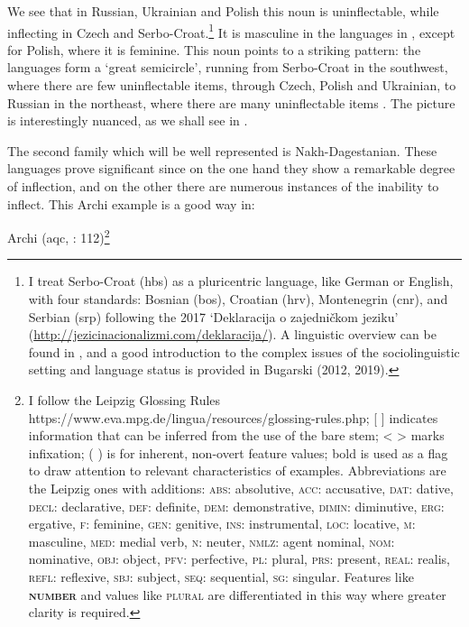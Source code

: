 \documentclass[output=paper]{langscibook}
\begin{document}
We see that in Russian, Ukrainian and Polish this noun is uninflectable, while inflecting in Czech and Serbo-Croat.\footnote{ \textrm{I treat Serbo-Croat (hbs) as a pluricentric language, like German or English, with four standards: Bosnian (bos), Croatian (hrv), Montenegrin (cnr), and Serbian (srp) following the 2017 ‘Deklaracija o zajedničkom jeziku’ (}\url{http://jezicinacionalizmi.com/deklaracija/}\textrm{). A linguistic overview can be found in \citet{CorbettBrowne2018}, and a good introduction to the complex issues of the sociolinguistic setting and language status is provided in Bugarski (2012, 2019).}} It is masculine in the languages in , except for Polish, where it is feminine. This noun points to a striking pattern: the languages form a ‘great semicircle’, running from Serbo-Croat in the southwest, where there are few uninflectable items, through Czech, Polish and Ukrainian, to Russian in the northeast, where there are many uninflectable items \citep[11-12]{Worth1966}. The picture is interestingly nuanced, as we shall see in .

The second family which will be well represented is Nakh-Dagestanian. These languages prove significant since on the one hand they show a remarkable degree of inflection, and on the other there are numerous instances of the inability to inflect. This Archi example is a good way in: 

Archi (aqc, \citealt{ChumakinaBond2016}: 112)\footnote{ \textrm{I follow the Leipzig Glossing Rules https://www.eva.mpg.de/lingua/resources/glossing-rules.php; [ ] indicates information that can be inferred from the use of the bare stem; < > marks infixation; ( ) is for inherent, non-overt feature values; bold is used as a flag to draw attention to relevant characteristics of examples. Abbreviations are the Leipzig ones with additions:} \textrm{\textsc{abs}}\textrm{: absolutive,} \textrm{\textsc{acc}}\textrm{: accusative,} \textrm{\textsc{dat}}\textrm{: dative,} \textrm{\textsc{decl}}\textrm{: declarative,} \textrm{\textsc{def}}\textrm{: definite,} \textrm{\textsc{dem}}\textrm{: demonstrative,} \textrm{\textsc{dimin}}\textrm{: diminutive,} \textrm{\textsc{erg}}\textrm{: ergative,} \textrm{\textsc{f}}\textrm{: feminine,} \textrm{\textsc{gen}}\textrm{: genitive,} \textrm{\textsc{ins}}\textrm{: instrumental,} \textrm{\textsc{loc}}\textrm{: locative,} \textrm{\textsc{m}}\textrm{: masculine,} \textrm{\textsc{med}}\textrm{: medial verb,} \textrm{\textsc{n}}\textrm{: neuter,} \textrm{\textsc{nmlz}}\textrm{: agent nominal,} \textrm{\textsc{nom}}\textrm{: nominative,} \textrm{\textsc{obj}}\textrm{: object,} \textrm{\textsc{pfv}}\textrm{: perfective,} \textrm{\textsc{pl}}\textrm{: plural,} \textrm{\textsc{prs}}\textrm{: present,} \textrm{\textsc{real}}\textrm{: realis,} \textrm{\textsc{refl}}\textrm{: reflexive,} \textrm{\textsc{sbj}}\textrm{: subject,} \textrm{\textsc{seq}}\textrm{: sequential,} \textrm{\textsc{sg}}\textrm{: singular. Features like} \textrm{\textbf{\textsc{number}}} \textrm{and values like} \textrm{\textsc{plural}} \textrm{are differentiated in this way where greater clarity is required.}} 
\end{document}
